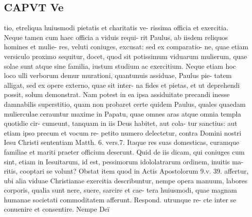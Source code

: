 \documentclass{article}
\begin{document}
\begin{pages}
\section*{CAPVT  Ve }
\marginpar{[ p.261 ]}tio, etreliqua huiusmodi pietatis et charitatis ve- rissima officia et exercitia. Neque tamen cum haec officia a viduis requi- rit Paulus, ab iisdem reliquos homines et mulie- res, veluti coniuges, excusat: sed ex comparatio- ne, quae etiam versiculo proximo sequitur, docet, quod sit potissimum viduarum mulierum, quae solae sunt atque sine familia, iustum studium ac exercitium. Neque etiam hoc loco ulli verborum demur murationi, quantunuis assiduae, Paulus pie- tatem alligat, sed ex opere externo, quae sit inter- na fides et pietas, et ut deprehendi possit, solum demonstrat. Nam potest in ea ipsa assiduitate precandi inesse damnabilis superstitio, quam non probaret certe quidem Paulus, quales quaedam mulierculae cerauntur maxime in Papatu, quae omnes aras atque omnia templa quotidie cir- cumeunt, tanquam in iis Deus habitet, aut cola- tur sanctius: aut etiam ipso precum et vocum re- petito numero delectetur, contra Domini nostri Iesu Christi sententiam Matth. 6. vers.7. Itaque res suas domesticas, curamque familiae et mariti praeter officium deserunt. Quid de iis dicam, qui coniuges cum sint, etiam in Iesuitarum, id est, pessimorum idololatrarum ordinem, inuitis ma- ritis, cooptari se volunt? Obstat item quod in Actis Apostolorum 9.v. 39. affertur, ubi alia viduae Christianae exercitia describuntur, nempe opera manuum, labores corporis, qualia sunt nere, suere, sarcire et cae- tera huiusmodi, quae magnam humanae societati commoditatem afferunt. Respond. utrunque re- cte inter se conuenire et consentire. Nempe Deï 

\end{pages}
\end{document}
